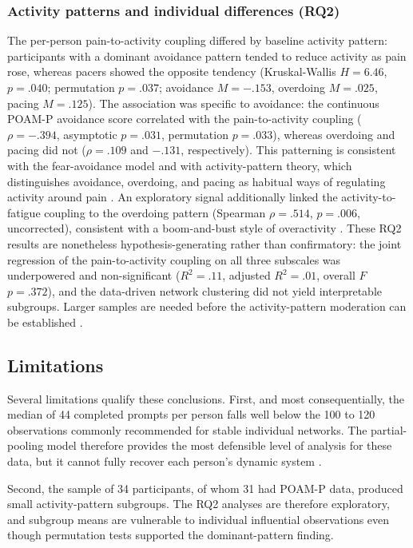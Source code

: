 \documentclass[11pt,a4paper]{article}
\begin{document}
\subsubsection{Activity patterns and individual differences (RQ2)}
The per-person pain-to-activity coupling differed by baseline activity pattern: participants
with a dominant avoidance pattern tended to reduce activity as pain rose, whereas pacers showed
the opposite tendency (Kruskal-Wallis $H=6.46$, $p=.040$; permutation $p=.037$; avoidance
$M=-.153$, overdoing $M=.025$, pacing $M=.125$). The association was specific to avoidance:
the continuous POAM-P avoidance score correlated with the pain-to-activity coupling
($\rho=-.394$, asymptotic $p=.031$, permutation $p=.033$), whereas overdoing and pacing did
not ($\rho=.109$ and $-.131$, respectively). This patterning is consistent with the
fear-avoidance model \citep{vlaeyen2000fear,leeuw2007fear} and with activity-pattern theory,
which distinguishes avoidance, overdoing, and pacing as habitual ways of regulating activity
around pain \citep{cane2013pain,andrews2012activity}. An exploratory signal additionally
linked the activity-to-fatigue coupling to the overdoing pattern (Spearman $\rho=.514$,
$p=.006$, uncorrected), consistent with a boom-and-bust style of overactivity
\citep{nielson2013activity}. These RQ2 results are nonetheless hypothesis-generating rather
than confirmatory: the joint regression of the pain-to-activity coupling on all three
subscales was underpowered and non-significant ($R^2=.11$, adjusted $R^2=.01$, overall
$F$ $p=.372$), and the data-driven network clustering did not yield interpretable subgroups.
Larger samples are needed before the activity-pattern moderation can be established
\citep{wright2020personalized}.

\subsection{Limitations}
Several limitations qualify these conclusions. First, and most consequentially, the median of
44 completed prompts per person falls well below the 100 to 120 observations commonly
recommended for stable individual networks. The partial-pooling model therefore provides the
most defensible level of analysis for these data, but it cannot fully recover each person's
dynamic system \citep{beltz2016bridging}.

Second, the sample of 34 participants, of whom 31 had POAM-P data, produced small
activity-pattern subgroups. The RQ2 analyses are therefore exploratory, and subgroup means
are vulnerable to individual influential observations even though permutation tests supported
the dominant-pattern finding.
\end{document}
